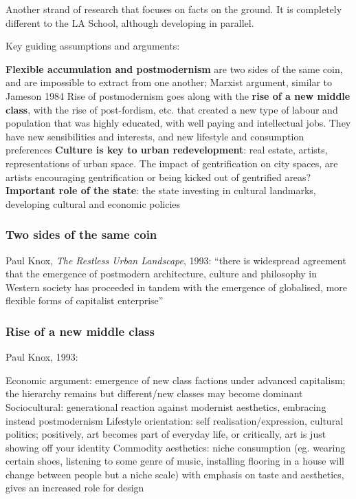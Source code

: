 \documentclass{article}
\begin{document}
Another strand of research that focuses on facts on the ground. It is completely different to the LA School, although developing in parallel.

Key guiding assumptions and arguments:

\begin{outline}
	\1 \textbf{Flexible accumulation and postmodernism} are two sides of the same coin, and are impossible to extract from one another; Marxist argument, similar to Jameson 1984
	\1 Rise of postmodernism goes along with the \textbf{rise of a new middle class}, with the rise of post-fordism, etc. that created a new type of labour and population that was highly educated, with well paying and intellectual jobs. They have new sensibilities and interests, and new lifestyle and consumption preferences
	\1 \textbf{Culture is key to urban redevelopment}: real estate, artists, representations of urban space. The impact of gentrification on city spaces, are artists encouraging gentrification or being kicked out of gentrified areas?
	\1 \textbf{Important role of the state}: the state investing in cultural landmarks, developing cultural and economic policies
\end{outline}

\subsubsection{Two sides of the same coin}

Paul Knox, \textit{The Restless Urban Landscape}, 1993: ``there is widespread agreement that the emergence of postmodern architecture, culture and philosophy in Western society has proceeded in tandem with the emergence of globalised, more flexible forms of capitalist enterprise''

\subsubsection{Rise of a new middle class}

Paul Knox, 1993:

\begin{outline}
	\1 Economic argument: emergence of new class factions under advanced capitalism; the hierarchy remains but different/new classes may become dominant
	\1 Sociocultural: generational reaction against modernist aesthetics, embracing instead postmodernism
	\1 Lifestyle orientation: self realisation/expression, cultural politics; positively, art becomes part of everyday life, or critically, art is just showing off your identity
	\1 Commodity aesthetics: niche consumption (eg. wearing certain shoes, listening to some genre of music, installing flooring in a house will change between people but a niche scale) with emphasis on taste and aesthetics, gives an increased role for design
\end{outline}
\end{document}
